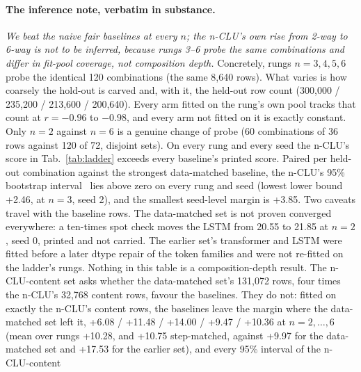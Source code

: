 \documentclass{article} %
\begin{document}
\paragraph{The inference note, verbatim in substance.} \emph{We beat the naive fair baselines at
every $n$; the n-CLU's own rise from 2-way to 6-way is not to be inferred, because rungs 3--6
probe the same combinations and differ in fit-pool coverage, not composition depth.} Concretely,
rungs $n=3,4,5,6$ probe the identical 120 combinations (the same 8,640 rows). What varies is how
coarsely the hold-out is carved and, with it, the held-out row count (300,000 / 235,200 /
213,600 / 200,640). Every arm fitted on the rung's own pool tracks that count at
$r=-0.96$ to $-0.98$, and every arm not fitted on it is exactly constant.
Only $n=2$ against $n=6$ is a genuine change of probe (60 combinations of 36 rows against 120 of
72, disjoint sets). %
On every rung and every seed the n-CLU's score in Tab.~\ref{tab:ladder} exceeds every baseline's
printed score. Paired per held-out combination against the strongest data-matched baseline, the n-CLU's 95\% %
bootstrap interval~\citep{efron1979bootstrap} lies above zero on every rung and seed (lowest lower
bound +2.46, at $n=3$, seed 2), and the smallest seed-level margin is +3.85. Two caveats travel with %
the baseline rows. The data-matched set is not proven converged everywhere: a ten-times spot check %
moves the LSTM from 20.55 to 21.85 at $n=2$, seed 0, printed and not carried. The earlier set's %
transformer and LSTM were fitted before a later dtype repair of the
token families and were not re-fitted on the ladder's rungs. Nothing in this table is a
composition-depth result.
The n-CLU-content set asks whether the data-matched set's 131,072 rows, four times the n-CLU's
32,768 content rows, favour the baselines. They do not: fitted on exactly the n-CLU's content rows, %
the baselines leave the margin where the data-matched set left it, +6.08 / +11.48 / +14.00 / +9.47 / %
+10.36 at $n=2,\ldots,6$ (mean over rungs +10.28, and +10.75 step-matched, against +9.97 for the %
data-matched set and +17.53 for the earlier set), and every 95\% interval of the n-CLU-content %
\end{document}
